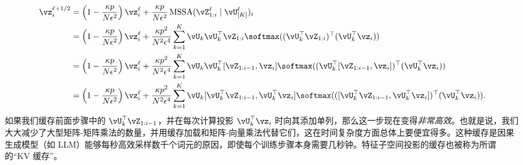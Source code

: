 \documentclass[../../book-main_zh.tex]{subfiles}
\begin{document}
\begin{align}
    \vz_{i}^{\ell + 1/2}
    &= \left(1 - \frac{\kappa p}{N\epsilon^{2}}\right)\vz_{i}^{\ell}
    + \frac{\kappa p}{N
    \epsilon^{2}}\operatorname{MSSA}(\vZ_{1:i}^{\ell} \mid
    \vU_{[K]}^{\ell})_{i} \\
    &= \left(1 - \frac{\kappa p}{N\epsilon^{2}}\right)\vz_{i}^{\ell}
    + \frac{\kappa p^{2}}{N^{2} \epsilon^{4}}\sum_{k =
    1}^{K}\vU_{k}\vU_{k}^{\top}\vZ_{1:i}\softmax((\vU_{k}^{\top}\vZ_{1:i})^{\top}(\vU_{k}^{\top}\vz_{i}))
    \\
    &= \left(1 - \frac{\kappa p}{N\epsilon^{2}}\right)\vz_{i}^{\ell}
    + \frac{\kappa p^{2}}{N^{2} \epsilon^{4}}\sum_{k =
    1}^{K}\vU_{k}\vU_{k}^{\top}[\vZ_{1:i-1},
    \vz_{i}]\softmax((\vU_{k}^{\top}[\vZ_{1:i-1},
    \vz_{i}])^{\top}(\vU_{k}^{\top}\vz_{i})) \\
    &= \left(1 - \frac{\kappa p}{N\epsilon^{2}}\right)\vz_{i}^{\ell}
    + \frac{\kappa p^{2}}{N^{2} \epsilon^{4}}\sum_{k =
    1}^{K}\vU_{k}[\vU_{k}^{\top}\vZ_{1:i-1},
    \vU_{k}^{\top}\vz_{i}]\softmax(([\vU_{k}^{\top}\vZ_{1:i-1},
    \vU_{k}^{\top}\vz_{i}])^{\top}(\vU_{k}^{\top}\vz_{i})).
\end{align}
如果我们缓存前面步骤中的 \(\vU_{k}^{\top}\vZ_{1:i-1}\)，并在每次计算投影 \(\vU_{k}^{\top}\vz_{i}\) 时向其添加单列，那么这一步现在变得\textit{非常高效}。也就是说，我们大大减少了大型矩阵-矩阵乘法的数量，并用缓存加载和矩阵-向量乘法代替它们，这在时间复杂度方面总体上要便宜得多。这种缓存是因果生成模型（如 LLM）能够每秒高效采样数千个词元的原因，即使每个训练步骤本身需要几秒钟。特征子空间投影的缓存也被称为所谓的“KV 缓存”。
\end{document}
